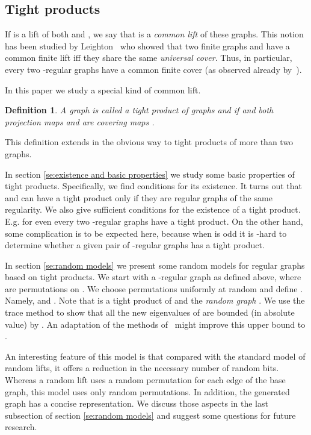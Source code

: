 \documentclass[12pt]{article}
\newtheorem{open question}[theorem]{Open question}
\newtheorem{definition}[theorem]{Definition}
\begin{document}
\subsection{Tight products}
If  is a lift of both  and , we say that  is a {\em common lift} of these graphs.
This notion has been studied by Leighton~\cite{Lei82} who showed
that two finite graphs  and  have a common finite lift iff they share the same {\em universal cover}.
Thus, in particular, every two -regular graphs have a common finite cover (as observed already by~\cite{AG81}).

In this paper we study a special kind of common lift.
\begin{definition}
A graph  is called a {\em tight product} of graphs  and  if  and 
both projection maps  and  are covering maps .
\end{definition}
This definition extends in the obvious way to tight products of more than two graphs.

In section \ref{se:existence and basic properties} we study some basic properties of tight products.
Specifically, we find conditions for its existence.
It turns out that  and  can have a tight product only if they are regular graphs 
of the same regularity. We also give sufficient conditions for the existence of a tight product.
E.g. for  even every two -regular graphs have a tight product.
On the other hand, some complication is to be expected here, because when  is odd
it is -hard to determine whether a given pair of -regular graphs has a tight product.

In section \ref{se:random models} we present some random models for regular graphs based on tight products.
We start with a -regular graph  as defined above,
where  are permutations on .
We choose permutations  uniformly at random and define .
Namely,  and . 
Note that  is a tight product of  and the {\em random graph} . 
We use the trace method to show that all the new eigenvalues of  are bounded (in absolute value) by .
An adaptation of the methods of~\cite{LP09} might improve this upper bound to .

An interesting feature of this model is that compared with the standard model of random lifts,
it offers a reduction in the necessary number of random bits. Whereas a random lift uses a
random permutation for each edge of the base graph, this model uses only  random permutations. 
In addition, the generated graph has a concise representation. We discuss those aspects in the last 
subsection of section \ref{se:random models} and suggest some questions for future research.
\end{document}
